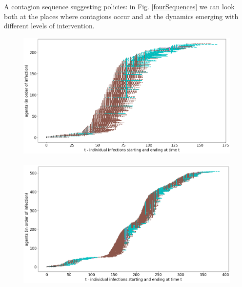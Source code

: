 \documentclass[8pt]{beamer}
\begin{document}
\begin{frame}{}

A contagion sequence suggesting policies: in Fig. \ref{fourSequences} we can look both at the places where contagions occur and at the dynamics emerging with different levels of intervention. 

\begin{figure}[H]
\center
\includegraphics[scale=0.105]{withShort1.png}~~~~~~~~~~~\includegraphics[scale=0.105]{withShort1A.png} 


\end{figure}
\end{frame}
\end{document}
